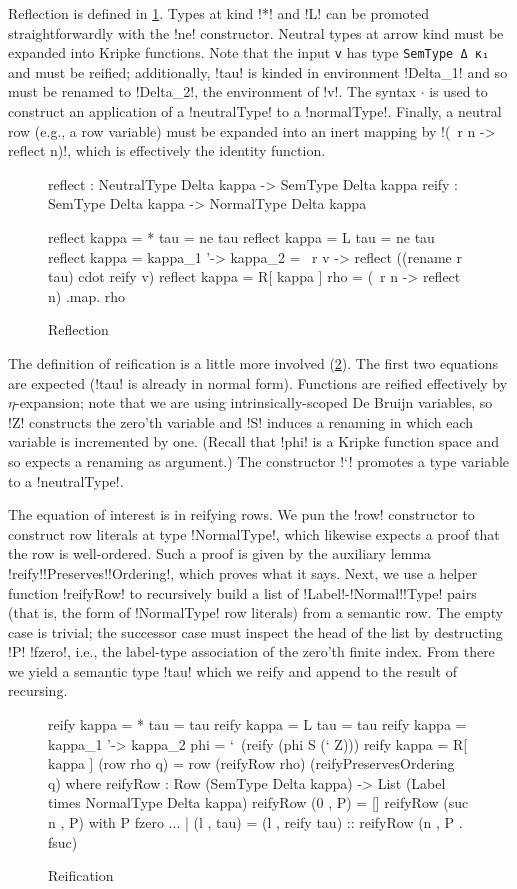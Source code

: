 \documentclass[sigplan,10pt,review]{acmart}\settopmatter{printfolios=true,printccs=false,printacmref=false}
\begin{document}
Reflection is defined in \cref{fig:reflection}. Types at kind !*! and !L! can be promoted straightforwardly with the !ne! constructor. Neutral types at arrow kind must be expanded into Kripke functions. Note that the input \verb!v! has type \verb!SemType Δ κ₁! and must be reified; additionally, !tau! is kinded in environment !Delta_1! and so must be renamed to !Delta_2!, the environment of !v!. The syntax $\cdot$ is used to construct an application of a !neutralType! to a !normalType!. Finally, a neutral row (e.g., a row variable) must be expanded into an inert mapping by !(\ r n -> reflect n)!, which is effectively the identity function. 
\begin{figure}
\begin{agda}
reflect : NeutralType Delta kappa -> SemType Delta kappa 
reify : SemType Delta kappa -> NormalType Delta kappa

reflect {kappa = *} tau = ne tau
reflect {kappa = L} tau = ne tau
reflect {kappa = kappa_1 '-> kappa_2} = 
  \ r v -> reflect ((rename r tau) cdot reify v)
reflect {kappa = R[ kappa ]} rho = (\ r n -> reflect n) .map. rho
\end{agda}
\caption{Reflection}
\label{fig:reflection}
\end{figure}

The definition of reification is a little more involved (\cref{fig:reification}). The first two equations are expected (!tau! is already in normal form). Functions are reified effectively by $\eta$\--expan\-sion; note that we are using intrinsically-scoped De Bruijn variables, so !Z! constructs the zero'th variable and !S! induces a renaming in which each variable is incremented by one. (Recall that !phi! is a Kripke function space and so expects a renaming as argument.) The constructor !`! promotes a type variable to a !neutralType!. 

The equation of interest is in reifying rows. We pun the !row! constructor to construct row literals at type !NormalType!, which likewise expects a proof that the row is well-ordered. Such a proof is given by the auxiliary lemma !reify!\-!Preserves!\-!Ordering!, which proves what it says. Next, we use a helper function !reifyRow! to recursively build a list of !Label!\--!Normal!\-!Type! pairs (that is, the form of !NormalType! row literals) from a semantic row. The empty case is trivial; the successor case must inspect the head of the list by destructing !P! !fzero!, i.e., the label\--type association of the zero'th finite index. From there we yield a semantic type !tau! which we reify and append to the result of recursing.
\begin{figure}
\begin{agda}
reify {kappa = *} tau = tau
reify {kappa = L} tau = tau
reify {kappa = kappa_1 '-> kappa_2} phi = `\ (reify (phi S (` Z)))
reify {kappa = R[ kappa ]} (row rho q) = 
  row (reifyRow rho) (reifyPreservesOrdering q)
  where
    reifyRow : Row (SemType Delta kappa) -> 
               List (Label times NormalType Delta kappa)
    reifyRow (0 , P) = [] 
    reifyRow (suc n , P) with P fzero 
    ... | (l , tau) = 
      (l , reify tau) :: reifyRow (n , P . fsuc)
\end{agda}
\caption{Reification}
\label{fig:reification}
\end{figure}
\end{document}
